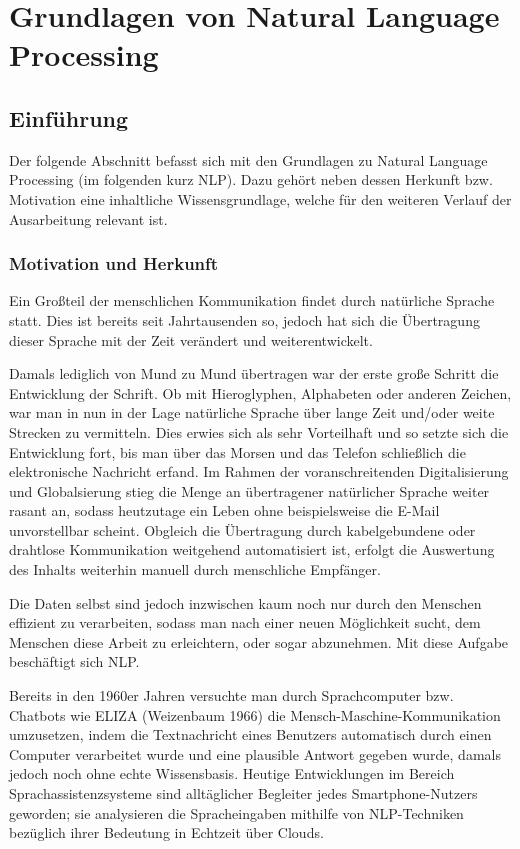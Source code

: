 \documentclass[12pt]{article}
\begin{document}
\section{Grundlagen von Natural Language Processing}
\subsection{Einführung}
Der folgende Abschnitt befasst sich mit den Grundlagen zu Natural Language Processing (im folgenden kurz NLP). Dazu gehört neben dessen Herkunft bzw. Motivation eine inhaltliche Wissensgrundlage, welche für den weiteren Verlauf der Ausarbeitung relevant ist. 

\subsubsection{Motivation und Herkunft}
Ein Großteil der menschlichen Kommunikation findet durch natürliche Sprache statt. Dies ist bereits seit Jahrtausenden so, jedoch hat sich die Übertragung dieser Sprache mit der Zeit verändert und weiterentwickelt. 

Damals lediglich von Mund zu Mund übertragen war der erste große Schritt die Entwicklung der Schrift. Ob mit Hieroglyphen, Alphabeten oder anderen Zeichen, war man in nun in der Lage natürliche Sprache über lange Zeit und/oder weite Strecken zu vermitteln. Dies erwies sich als sehr Vorteilhaft und so setzte sich die Entwicklung fort, bis man über das Morsen und das Telefon schließlich die elektronische Nachricht erfand. 
Im Rahmen der voranschreitenden Digitalisierung und Globalsierung stieg die Menge an übertragener natürlicher Sprache weiter rasant an, sodass heutzutage ein Leben ohne beispielsweise die E-Mail unvorstellbar scheint. Obgleich die Übertragung durch kabelgebundene oder drahtlose Kommunikation weitgehend automatisiert ist, erfolgt die Auswertung des Inhalts weiterhin manuell durch menschliche Empfänger.

Die Daten selbst sind jedoch inzwischen kaum noch nur durch den Menschen effizient zu verarbeiten, sodass man nach einer neuen Möglichkeit sucht, dem Menschen diese Arbeit zu erleichtern, oder sogar abzunehmen. Mit diese Aufgabe beschäftigt sich NLP. 

Bereits in den 1960er Jahren versuchte man durch Sprachcomputer bzw. Chatbots wie ELIZA (Weizenbaum 1966) die Mensch-Maschine-Kommunikation umzusetzen, indem die Textnachricht eines Benutzers automatisch durch einen Computer verarbeitet wurde und eine plausible Antwort gegeben wurde, damals jedoch noch ohne echte Wissensbasis. 
Heutige Entwicklungen im Bereich Sprachassistenzsysteme sind alltäglicher Begleiter jedes Smartphone-Nutzers geworden; sie analysieren die Spracheingaben mithilfe von NLP-Techniken bezüglich ihrer Bedeutung in Echtzeit über Clouds.
\end{document}
